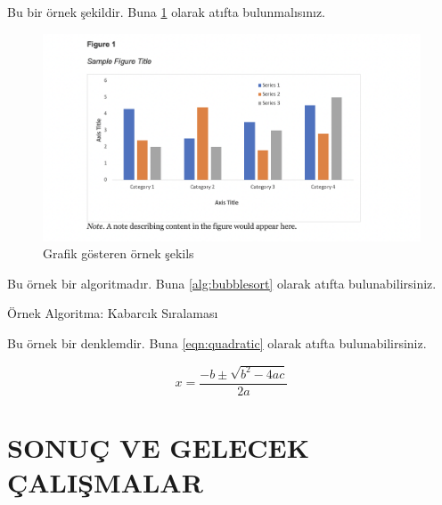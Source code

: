 \documentclass[turkish,bibstyle=apa]{kgtu}
\begin{document}
Bu bir örnek şekildir. Buna \ref{fig:sample_figure} olarak atıfta bulunmalısınız.

\begin{figure}[!ht]
    \centering
    \shorthandoff{=}
    \includegraphics[width=\textwidth]{figures/fig1.png}
    \shorthandon{=}
    \caption{Grafik gösteren örnek şekils}
    \label{fig:sample_figure}
\end{figure}

Bu örnek bir algoritmadır. Buna \ref{alg:bubblesort} olarak atıfta bulunabilirsiniz.

\begin{algorithm}
\caption{Örnek Algoritma: Kabarcık Sıralaması}
\label{alg:bubblesort}
\end{algorithm}

Bu örnek bir denklemdir. Buna \ref{eqn:quadratic} olarak atıfta bulunabilirsiniz.

\begin{equation}
    \label{eqn:quadratic}
    x = \frac{-b \pm \sqrt{b^2 - 4ac}}{2a}
\end{equation}

\chapter{SONUÇ VE GELECEK ÇALIŞMALAR}
\lipsum[15-20]
\else
\end{document}
